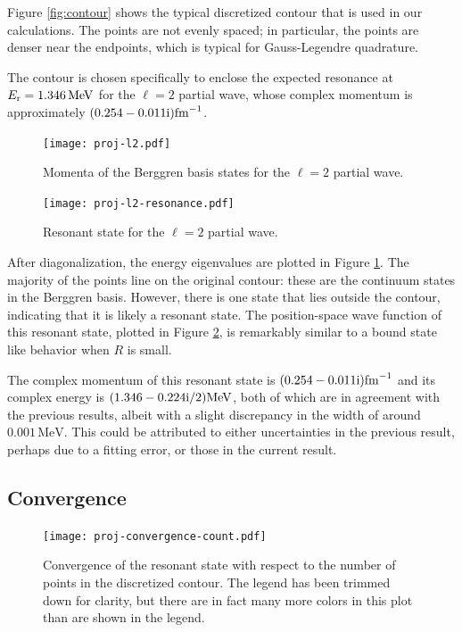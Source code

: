 \documentclass[amsmath, amssymb, aps, floatfix, nofootinbib, preprintnumbers,
  showpacs, superscriptaddress, twocolumn]{revtex4-1}
\begin{document}
Figure \ref{fig:contour} shows the typical discretized contour that is used in
our calculations.  The points are not evenly spaced; in particular, the points
are denser near the endpoints, which is typical for Gauss-Legendre quadrature.

The contour is chosen specifically to enclose the expected resonance at
$E_{\text r} = 1.346\,\mathrm{MeV}$ for the $\ell = 2$ partial wave, whose
complex momentum is approximately $(0.254 - 0.011\mathrm{i})\mathrm{fm}^{-1}$.

\begin{figure}
  \texttt{[image: proj-l2.pdf]}
  \caption{Momenta of the Berggren basis states for the $\ell = 2$ partial
    wave.}
  \label{fig:l2}
\end{figure}

\begin{figure}
  \texttt{[image: proj-l2-resonance.pdf]}
  \caption{Resonant state for the $\ell = 2$ partial wave.}
  \label{fig:l2-resonance}
\end{figure}

After diagonalization, the energy eigenvalues are plotted in Figure
\ref{fig:l2}.  The majority of the points line on the original contour: these
are the continuum states in the Berggren basis.  However, there is one state
that lies outside the contour, indicating that it is likely a resonant state.
The position-space wave function of this resonant state, plotted in Figure
\ref{fig:l2-resonance}, is remarkably similar to a bound state like behavior
when $R$ is small.

The complex momentum of this resonant state is
$(0.254 - 0.011\mathrm{i})\mathrm{fm}^{-1}$ and its complex energy is
$(1.346 - 0.224\mathrm{i}/2)\mathrm{MeV}$, both of which are in agreement with the
previous results, albeit with a slight discrepancy in the width of around
$0.001\,\mathrm{MeV}$.  This could be attributed to either uncertainties in
the previous result, perhaps due to a fitting error, or those in the current
result.

\subsection{Convergence}

\begin{figure}
  \texttt{[image: proj-convergence-count.pdf]}
  \caption{Convergence of the resonant state with respect to the number of
    points in the discretized contour.  The legend has been trimmed down for
    clarity, but there are in fact many more colors in this plot than are
    shown in the legend.}
  \label{fig:convergence-count}
\end{figure}
\end{document}
